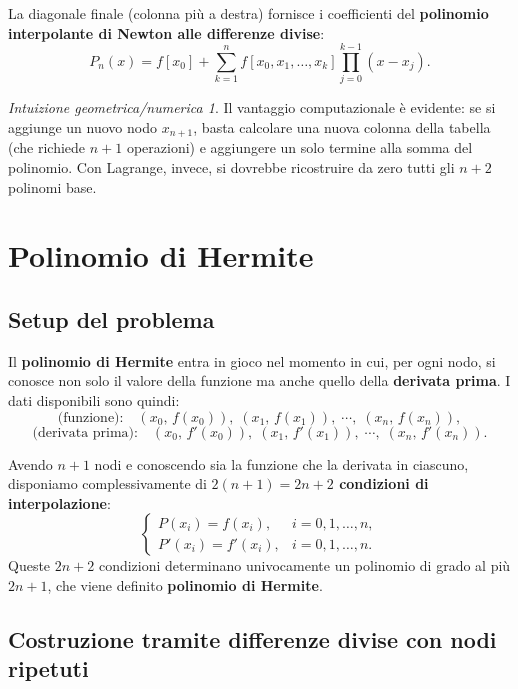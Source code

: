 \documentclass[a4paper,12pt]{article}
\theoremstyle{definition}
\theoremstyle{remark}
\newtheorem*{intuizione}{Intuizione geometrica/numerica}
\begin{document}
La diagonale finale (colonna più a destra) fornisce i coefficienti del
\textbf{polinomio interpolante di Newton alle differenze divise}:
\[
  P_n(x) = f[x_0]
  + \sum_{k=1}^{n} f[x_0,x_1,\ldots,x_k]
    \prod_{j=0}^{k-1}(x - x_j).
\]

\begin{intuizione}
Il vantaggio computazionale è evidente: se si aggiunge un nuovo nodo
$x_{n+1}$, basta calcolare una nuova colonna della tabella (che richiede
$n+1$ operazioni) e aggiungere un solo termine alla somma del polinomio.
Con Lagrange, invece, si dovrebbe ricostruire da zero tutti gli $n+2$
polinomi base.
\end{intuizione}

\section{Polinomio di Hermite}

\subsection{Setup del problema}

Il \textbf{polinomio di Hermite} entra in gioco nel momento in cui, per
ogni nodo, si conosce non solo il valore della funzione ma anche quello
della \textbf{derivata prima}. I dati disponibili sono quindi:
\[
  \text{(funzione):}\quad
  (x_0,\,f(x_0)),\;(x_1,\,f(x_1)),\;\cdots,\;(x_n,\,f(x_n)),
\]
\[
  \text{(derivata prima):}\quad
  (x_0,\,f'(x_0)),\;(x_1,\,f'(x_1)),\;\cdots,\;(x_n,\,f'(x_n)).
\]

Avendo $n+1$ nodi e conoscendo sia la funzione che la derivata in
ciascuno, disponiamo complessivamente di \textbf{$2(n+1) = 2n+2$
condizioni di interpolazione}:
\[
  \begin{cases}
    P(x_i) = f(x_i),   & i = 0,1,\ldots,n, \\
    P'(x_i) = f'(x_i), & i = 0,1,\ldots,n.
  \end{cases}
\]
Queste $2n+2$ condizioni determinano univocamente un polinomio di grado
al più $2n+1$, che viene definito \textbf{polinomio di Hermite}.

\subsection{Costruzione tramite differenze divise con nodi ripetuti}
\end{document}
